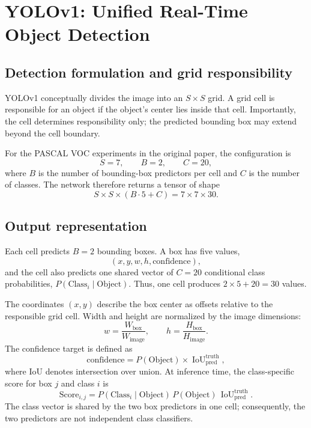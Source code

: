 \documentclass[11pt,a4paper]{article}
\begin{document}
\section{YOLOv1: Unified Real-Time Object Detection}
\label{sec:yolov1}
\subsection{Detection formulation and grid responsibility}
YOLOv1 conceptually divides the image into an $S\times S$ grid. A grid cell is responsible for an object if the object's center lies inside that cell. Importantly, the cell determines responsibility only; the predicted bounding box may extend beyond the cell boundary.

For the PASCAL VOC experiments in the original paper, the configuration is
\begin{equation}
  S=7, \qquad B=2, \qquad C=20,
\end{equation}
where $B$ is the number of bounding-box predictors per cell and $C$ is the number of classes. The network therefore returns a tensor of shape
\begin{equation}
  S\times S\times(B\cdot5+C)=7\times7\times30.
\end{equation}

\subsection{Output representation}
Each cell predicts $B=2$ bounding boxes. A box has five values,
\begin{equation}
  (x,y,w,h,\text{confidence}),
\end{equation}
and the cell also predicts one shared vector of $C=20$ conditional class probabilities, $P(\text{Class}_i\mid\text{Object})$. Thus, one cell produces $2\times5+20=30$ values.

The coordinates $(x,y)$ describe the box center as offsets relative to the responsible grid cell. Width and height are normalized by the image dimensions:
\begin{equation}
  w=\frac{W_{\text{box}}}{W_{\text{image}}}, \qquad
  h=\frac{H_{\text{box}}}{H_{\text{image}}}.
\end{equation}
The confidence target is defined as
\begin{equation}
  \text{confidence}=P(\text{Object})\times\operatorname{IoU}_{\text{pred}}^{\text{truth}},
\end{equation}
where IoU denotes intersection over union. At inference time, the class-specific score for box $j$ and class $i$ is
\begin{equation}
  \text{Score}_{i,j}=P(\text{Class}_i\mid\text{Object})\,P(\text{Object})\,\operatorname{IoU}_{\text{pred}}^{\text{truth}}.
\end{equation}
The class vector is shared by the two box predictors in one cell; consequently, the two predictors are not independent class classifiers.
\end{document}
